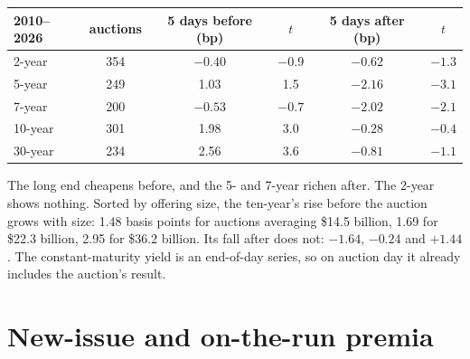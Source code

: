 \begin{center}
\small
\begin{tabular}{@{}lccccc@{}}
\toprule
2010--2026 & auctions & 5 days before (bp) & $t$ & 5 days after (bp) & $t$\\
\midrule
2-year & 354 & $-0.40$ & $-0.9$ & $-0.62$ & $-1.3$\\
5-year & 249 & 1.03 & 1.5 & $-2.16$ & $-3.1$\\
7-year & 200 & $-0.53$ & $-0.7$ & $-2.02$ & $-2.1$\\
10-year & 301 & 1.98 & 3.0 & $-0.28$ & $-0.4$\\
30-year & 234 & 2.56 & 3.6 & $-0.81$ & $-1.1$\\
\bottomrule
\end{tabular}
\end{center}

The long end cheapens before, and the 5- and 7-year richen after. The 2-year shows nothing. Sorted by offering size, the ten-year's rise before the
auction grows with size: 1.48 basis points for auctions averaging \$14.5 billion, 1.69 for \$22.3 billion, 2.95 for \$36.2 billion. Its
fall after does not: $-1.64$, $-0.24$ and $+1.44$. The constant-maturity yield is an end-of-day series, so on auction day it already includes the
auction's result.

\begin{omfigure}

\label{fig:s2:supply-trades:path}
\end{omfigure}

\section{New-issue and on-the-run premia}

